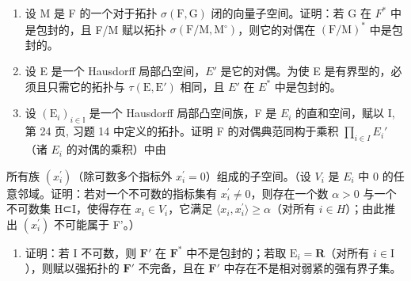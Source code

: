 \begin{enumerate}
\def\labelenumi{\alph{enumi})}
\tightlist
\item
  设 M 是 F 的一个对于拓扑 \(\sigma(\mathrm{F},\mathrm{G})\) 闭的向量子空间。证明：若 G 在 \(F^{*}\) 中是包封的，且 F/M 赋以拓扑 \(\sigma(\mathrm{F}/\mathrm{M},\mathrm{M}^{\circ})\)，则它的对偶在 \((\mathrm{F}/\mathrm{M})^{*}\) 中是包封的。
\item
  设 E 是一个 Hausdorff 局部凸空间，\(E'\) 是它的对偶。为使 E 是有界型的，必须且只需它的拓扑与 \(\tau(\mathrm{E},\mathrm{E}')\) 相同，且 \(E'\) 在 \(E^{*}\) 中是包封的。
\item
  设 \((\mathrm{E}_{i})_{i\in\mathbb{I}}\) 是一个 Hausdorff 局部凸空间族，F 是 \(E_{i}\) 的直和空间，赋以 I, 第 24 页, 习题 14 中定义的拓扑。证明 F 的对偶典范同构于乘积 \(\prod_{i\in I}E_{i}'\)（诸 \(E_{i}\) 的对偶的乘积）中由
\end{enumerate}

所有族 \((x_{i}^{\prime})\)（除可数多个指标外 \(x_{i}^{\prime}=0\)）组成的子空间。（设 \(V_{i}\) 是 \(E_{i}\) 中 0 的任意邻域。证明：若对一个不可数的指标集有 \(x_{i}^{\prime}\neq0\)，则存在一个数 \(\alpha>0\) 与一个不可数集 H⊂I，使得存在 \(x_{i}\in V_{i}\)，它满足 \(\langle x_{i},x_{i}^{\prime}\rangle\geqslant\alpha\)（对所有 \(i\in H\)）；由此推出 \((x_{i}^{\prime})\) 不可能属于 F'。）

\begin{enumerate}
\def\labelenumi{\alph{enumi})}
\setcounter{enumi}{3}
\tightlist
\item
  证明：若 I 不可数，则 \(\mathbf{F}'\) 在 \(\mathbf{F}^*\) 中不是包封的；若取 \(\mathrm{E}_i = \mathbf{R}\)（对所有 \(i \in \mathrm{I}\)），则赋以强拓扑的 \(\mathbf{F}'\) 不完备，且在 \(\mathbf{F}'\) 中存在不是相对弱紧的强有界子集。
\end{enumerate}

